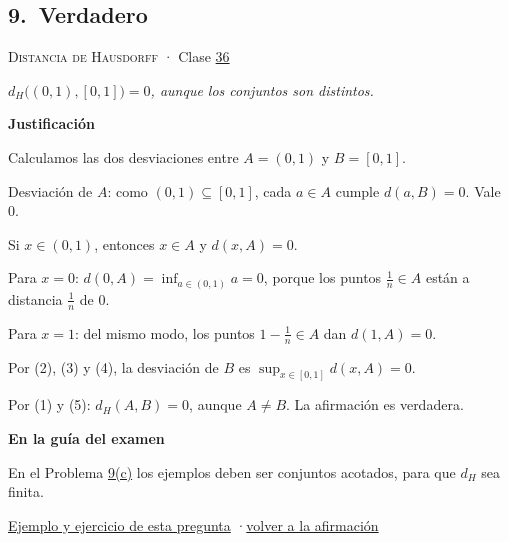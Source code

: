 \documentclass[11pt,a4paper]{article}
\newcommand{\bloque}[1]{\par\smallskip\noindent\textbf{\color{acento}#1}\par}
\begin{document}
\subsection*{\hypertarget{r-9}{}9.\ \textcolor{ok}{Verdadero}}
{\small \textsc{Distancia de Hausdorff} · Clase \href{https://decostruttivismo.github.io/MAT2514-repaso/pdf/MAT2514_apuntes_completos.pdf\#nameddest=section.36}{36}}\par
\emph{$d_H\bigl((0,1),[0,1]\bigr)=0$, aunque los conjuntos son distintos.}
\bloque{Justificación}
\begin{pasos}
\item[] Calculamos las dos desviaciones entre $A=(0,1)$ y $B=[0,1]$.
\item[(1)] Desviación de $A$: como $(0,1)\subseteq[0,1]$, cada $a\in A$ cumple $d(a,B)=0$. Vale $0$.
\item[(2)] Si $x\in(0,1)$, entonces $x\in A$ y $d(x,A)=0$.
\item[(3)] Para $x=0$: $d(0,A)=\inf_{a\in(0,1)}a=0$, porque los puntos $\frac1n\in A$ están a distancia $\frac1n$ de $0$.
\item[(4)] Para $x=1$: del mismo modo, los puntos $1-\frac1n\in A$ dan $d(1,A)=0$.
\item[(5)] Por (2), (3) y (4), la desviación de $B$ es $\sup_{x\in[0,1]}d(x,A)=0$.
\item[] Por (1) y (5): $d_H(A,B)=0$, aunque $A\ne B$. La afirmación es verdadera.
\end{pasos}
\bloque{En la guía del examen}
\begin{pasos}
\item[] En el Problema \hyperlink{prob-9}{9(c)} los ejemplos deben ser conjuntos acotados, para que $d_H$ sea finita.
\end{pasos}
\par{}
\par{\small \hyperlink{e-9}{Ejemplo y ejercicio de esta pregunta} \quad·\quad \hyperlink{q-9}{volver a la afirmación}}
\end{document}
